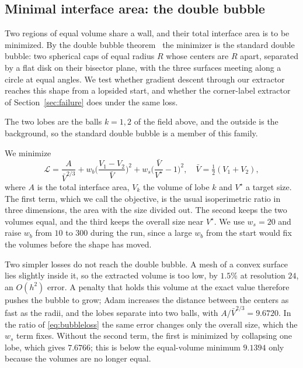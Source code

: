 \documentclass{egpubl}
\theoremstyle{definition}
\begin{document}
\subsection{Minimal interface area: the double bubble}
\label{sec:doublebubble}

Two regions of equal volume share a wall, and their total interface area is to
be minimized. By the double bubble theorem~\cite{hutchings2002} the minimizer
is the standard double bubble: two spherical caps of equal radius $R$ whose
centers are $R$ apart, separated by a flat disk on their bisector plane, with
the three surfaces meeting along a circle at equal angles. We test whether
gradient descent through our extractor reaches this shape from a lopsided
start, and whether the corner-label extractor of Section~\ref{sec:failure}
does under the same loss.

The two lobes are the balls $k=1,2$ of the field above, and the
outside is the background, so the standard double bubble is a member of this
family.

We minimize
\begin{equation}
  \mathcal{L} = \frac{A}{\bar V^{2/3}}
    + w_b \bigg(\frac{V_1 - V_2}{\bar V}\bigg)^{\!2}
    + w_s \bigg(\frac{\bar V}{V^\star} - 1\bigg)^{\!2},
  \quad \bar V = \tfrac{1}{2}(V_1 + V_2),
  \label{eq:bubbleloss}
\end{equation}
where $A$ is the total interface area, $V_k$ the volume of lobe $k$ and
$V^\star$ a target size. The first term, which we call the objective, is the
usual isoperimetric ratio in three dimensions, the area with the size divided out. The second keeps the two
volumes equal, and the third keeps the overall size near $V^\star$. We use
$w_s = 20$ and raise $w_b$ from $10$ to $300$ during the run, since a large
$w_b$ from the start would fix the volumes before the shape has moved.

Two simpler losses do not reach the double bubble. A mesh of a convex surface lies slightly inside it,
so the extracted volume is too low, by $1.5\%$ at resolution $24$, an
$O(h^2)$ error. A penalty that holds this volume at the exact value therefore
pushes the bubble to grow; Adam increases the distance between the centers as
fast as the radii, and the lobes separate into two balls, with
$A/\bar V^{2/3} = 9.6720$. In the ratio of \eqref{eq:bubbleloss} the same error
changes only the overall size, which the $w_s$ term fixes. Without the second
term, the first is minimized by collapsing one lobe, which gives $7.6766$; this
is below the equal-volume minimum $9.1394$ only because the volumes are no
longer equal.
\end{document}
